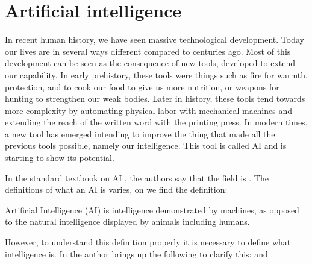 \documentclass[12pt,A4]{report}
\newcommand{\autobaj}{}
\theoremstyle{definition}
\begin{document}
\section{Artificial intelligence}
In recent human history, we have seen massive technological development. Today our lives are in several ways different compared to centuries ago. Most of this development can be seen as the consequence of new tools, developed to extend our capability. In early prehistory, these tools were things such as fire for warmth, protection, and to cook our food to give us more nutrition, or weapons for hunting to strengthen our weak bodies. Later in history, these tools tend towards more complexity by automating physical labor with mechanical machines and extending the reach of the written word with the printing press. In modern times, a new tool has emerged intending to improve the thing that made all the previous tools possible, namely our intelligence. This tool is called AI and is starting to show its potential. 

In the standard textbook on AI \citet[\textbf{PAGE}]{RusselNorvig}, the authors say that the field is . The definitions of what an AI is varies, on \citet{Wiki} we find the definition: 
\begin{displayquote}
Artificial Intelligence (AI) is intelligence demonstrated by machines, as opposed to the natural intelligence displayed by animals including humans.
\end{displayquote}
However, to understand this definition properly it is necessary to define what intelligence is. In \citet[\textbf{PAGE}]{TankandeMaskiner} the author brings up the following to clarify this:  and . 
\end{document}
